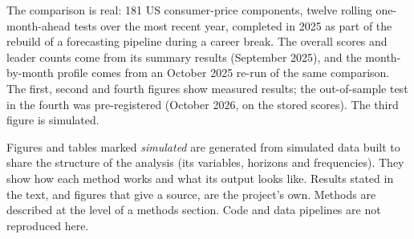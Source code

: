 \documentclass[
  british,
  a4paper,
]{article}
\begin{document}
The comparison is real: 181 US consumer-price components, twelve rolling
one-month-ahead tests over the most recent year, completed in 2025 as
part of the rebuild of a forecasting pipeline during a career break. The
overall scores and leader counts come from its summary results
(September 2025), and the month-by-month profile comes from an October
2025 re-run of the same comparison. The first, second and fourth figures
show measured results; the out-of-sample test in the fourth was
pre-registered (October 2026, on the stored scores). The third figure is
simulated.

Figures and tables marked \emph{simulated} are generated from simulated
data built to share the structure of the analysis (its variables,
horizons and frequencies). They show how each method works and what its
output looks like. Results stated in the text, and figures that give a
source, are the project's own. Methods are described at the level of a
methods section. Code and data pipelines are not reproduced here.
\end{document}
